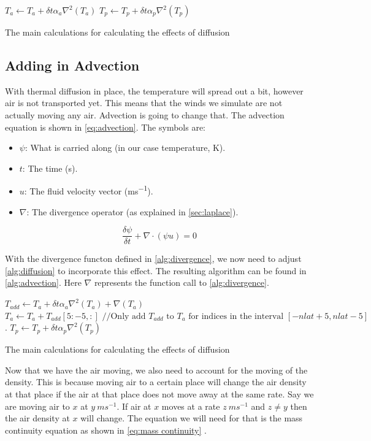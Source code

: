 \begin{algorithm}
    $T_a \leftarrow T_a + \delta t \alpha_a \nabla^2(T_a)$ \;
    $T_p \leftarrow T_p + \delta t \alpha_p \nabla^2(T_p)$ \;
    \caption{The main calculations for calculating the effects of diffusion}
    \label{alg:diffusion}
\end{algorithm}

\subsection{Adding in Advection}
With thermal diffusion in place, the temperature will spread out a bit, however air is not transported yet. This means that the winds we simulate are not actually moving any air. Advection is
going to change that. The advection equation is shown in \autoref{eq:advection}. The symbols are:

\begin{itemize}
    \item $\psi$: What is carried along (in our case temperature, \si{K}).
    \item $t$: The time (\si{s}).
    \item $u$: The fluid velocity vector (\si{ms^{-1}}).
    \item $\nabla$: The divergence operator (as explained in \autoref{sec:laplace}).
\end{itemize}

\begin{equation}
    \frac{\delta \psi}{\delta t} + \nabla \cdot (\psi u) = 0
    \label{eq:advection}
\end{equation}

With the divergence functon defined in \autoref{alg:divergence}, we now need to adjust \autoref{alg:diffusion} to incorporate this effect. The resulting algorithm can be found in 
\autoref{alg:advection}. Here $\nabla$ represents the function call to \autoref{alg:divergence}.

\begin{algorithm}
    $T_{add} \leftarrow T_a + \delta t \alpha_a \nabla^2(T_a) + \nabla(T_a)$ \;
    $T_a \leftarrow T_a + T_{add}[5:-5, :] \text{ //Only add } T_{add} \text{ to } T_a \text{ for indices in the interval } [-nlat + 5, nlat - 5]$. \;
    $T_p \leftarrow T_p + \delta t \alpha_p \nabla^2(T_p)$ \;
    \caption{The main calculations for calculating the effects of diffusion}
    \label{alg:advection}
\end{algorithm}

Now that we have the air moving, we also need to account for the moving of the density. This is because moving air to a certain place will change the air density at that place if the air at that 
place does not move away at the same rate. Say we are moving air to $x$ at $y \ ms^{-1}$. If air at $x$ moves at a rate $z \ ms^{-1}$ and $z \neq y$ then the air density at $x$ will change.
The equation we will need for that is the mass continuity equation as shown in \autoref{eq:mass continuity} \cite{masscontinue}.

